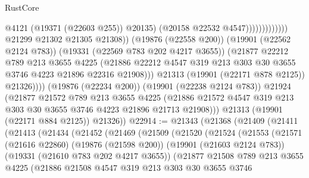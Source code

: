 \begin{lexlean}{RustCore}
\begin{coremodule}
                                                  @4121
                                                  (@19371 (@22603 @255))
                                                  @20135)
                                                (@20158 @22532 @4547)))))))))))))
                        @21299
                        @21302
                        @21305
                        @21308))
                    (@19876 (@22558 @200))
                    (@19901 (@22562 @2124 @783))
                    (@19331 (@22569 @783 @202 @4217 @3655))
                    (@21877
                      @22212
                      @789
                      @213
                      @3655
                      @4225
                      (@21886
                        @22212
                        @4547
                        @319
                        @213
                        @303
                        @30
                        @3655
                        @3746
                        @4223
                        @21896
                        @22316
                        @21908)))
                  @21313
                  (@19901 (@22171 @878 @2125))
                  @21326))))
          (@19876 (@22234 @200))
          (@19901 (@22238 @2124 @783))
          @21924
          (@21877
            @21572
            @789
            @213
            @3655
            @4225
            (@21886 @21572 @4547 @319 @213 @303 @30 @3655 @3746 @4223 @21896 @21713 @21908)))
        @21313
        (@19901 (@22171 @884 @2125))
        @21326))
@22914 := @21343
    (@21368
      (@21409
        (@21411
          (@21413
            (@21434
              (@21452
                (@21469
                  (@21509
                    (@21520
                      (@21524
                        (@21553
                          (@21571
                            (@21616 @22860)
                            (@19876 (@21598 @200))
                            (@19901 (@21603 @2124 @783))
                            (@19331 (@21610 @783 @202 @4217 @3655))
                            (@21877
                              @21508
                              @789
                              @213
                              @3655
                              @4225
                              (@21886
                                @21508
                                @4547
                                @319
                                @213
                                @303
                                @30
                                @3655
                                @3746

\end{coremodule}
\end{lexlean}
